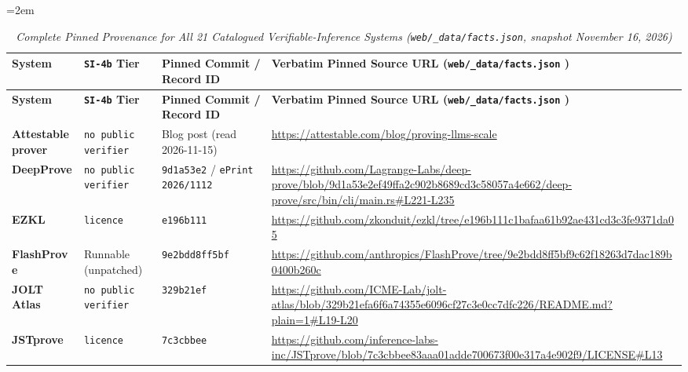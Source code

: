 \documentclass[11pt,letterpaper]{article}
\begin{document}
{\footnotesize\setlength{\tabcolsep}{4pt}\emergencystretch=2em
\begin{longtable}{@{}>{\raggedright\arraybackslash}p{} >{\raggedright\arraybackslash}p{} >{\raggedright\arraybackslash}p{} >{\raggedright\arraybackslash}p{}@{}}
\caption{\textit{Complete Pinned Provenance for All 21 Catalogued Verifiable-Inference Systems (\texttt{web/\allowbreak{}\_\allowbreak{}data/\allowbreak{}facts.\allowbreak{}json}, snapshot November 16, 2026)} \cite{iproofs2026}} \\
\toprule
\textbf{System} & \textbf{\texttt{SI-4b} Tier} & \textbf{Pinned Commit / Record ID} & \textbf{Verbatim Pinned Source URL (\texttt{web/\allowbreak{}\_\allowbreak{}data/\allowbreak{}facts.\allowbreak{}json} \cite{iproofs2026})} \\
\midrule
\endfirsthead
\toprule
\textbf{System} & \textbf{\texttt{SI-4b} Tier} & \textbf{Pinned Commit / Record ID} & \textbf{Verbatim Pinned Source URL (\texttt{web/\allowbreak{}\_\allowbreak{}data/\allowbreak{}facts.\allowbreak{}json} \cite{iproofs2026})} \\
\midrule
\endhead
\bottomrule
\endfoot
\textbf{Attestable prover} & \texttt{no public verifier} & Blog post (read 2026-11-15) & \url{https://attestable.com/blog/proving-llms-scale} \\
\textbf{DeepProve} & \texttt{no public verifier} & \texttt{9d1a53e2} / \texttt{ePrint 2026/\allowbreak{}1112} & \url{https://github.com/Lagrange-Labs/deep-prove/blob/9d1a53e2ef49ffa2c902b8689cd3c58057a4e662/deep-prove/src/bin/cli/main.rs\#L221-L235} \\
\textbf{EZKL} & \texttt{licence} & \texttt{e196b111} & \url{https://github.com/zkonduit/ezkl/tree/e196b111c1bafaa61b92ae431cd3c3fe9371da05} \\
\textbf{FlashProve} & Runnable (unpatched) & \texttt{9e2bdd8ff5bf} \cite{rinberg2026flashprove} & \url{https://github.com/anthropics/FlashProve/tree/9e2bdd8ff5bf9c62f18263d7dac189b0400b260c} \\
\textbf{JOLT Atlas} & \texttt{no public verifier} & \texttt{329b21ef} & \url{https://github.com/ICME-Lab/jolt-atlas/blob/329b21efa6f6a74355e6096cf27c3e0cc7dfc226/README.md?plain=1\#L19-L20} \\
\textbf{JSTprove} & \texttt{licence} & \texttt{7c3cbbee} & \url{https://github.com/inference-labs-inc/JSTprove/blob/7c3cbbee83aaa01adde700673f00e317a4e902f9/LICENSE\#L13} \\

\end{longtable}}
\end{document}
